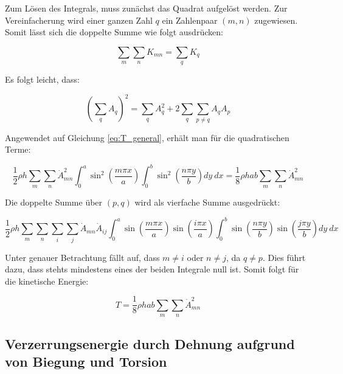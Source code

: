Zum Lösen des Integrals, muss zunächst das Quadrat aufgelöst werden. Zur Vereinfacherung wird einer ganzen Zahl $q$ ein Zahlenpaar $(m,n)$ zugewiesen.
Somit lässt sich die doppelte Summe wie folgt ausdrücken:

$$\sum_m\sum_n K_{mn}=\sum_q K_q$$

Es folgt leicht, dass:

$$\left(\sum_qA_q\right)^2=\sum_qA^2_q+2\sum_q\sum_{p\neq q}A_qA_p$$


Angewendet auf Gleichung \ref{eq:T_general}, erhält man für die quadratischen Terme:

\begin{equation}
\dfrac{1}{2}\rho h \sum_m\sum_n \dot{A}^2_{mn}\int_0^a\sin^2\left(\dfrac{m\pi x}{a}\right)\int_0^b\sin^2\left(\dfrac{n\pi y}{b}\right) dy \ dx=\dfrac{1}{8}\rho h a b\sum_m\sum_n \dot{A}^2_{mn}
\end{equation}

\newpage

Die doppelte Summe über $(p,q)$ wird als vierfache Summe ausgedrückt:



\begin{equation}
\dfrac{1}{2}\rho h \sum_m\sum_n\sum_i\sum_j \dot{A}_{mn}\dot{A}_{ij}\int_0^a\sin\left(\dfrac{m\pi x}{a}\right)\sin\left(\dfrac{i\pi x}{a}\right)\int_0^b\sin\left(\dfrac{n\pi y}{b}\right)\sin\left(\dfrac{j\pi y}{b}\right) dy \ dx
\end{equation}

Unter genauer Betrachtung fällt auf, dass $m\neq i$ oder $n\neq j$, da $q\neq p$. Dies führt dazu, dass stehts mindestens eines der beiden Integrale null ist. Somit folgt für die kinetische Energie:

\begin{equation}
T = \dfrac{1}{8}\rho h a b\sum_m\sum_n \dot{A}^2_{mn}
\label{eq:T}
\end{equation}









\subsection{Verzerrungsenergie durch Dehnung aufgrund von Biegung und Torsion}

